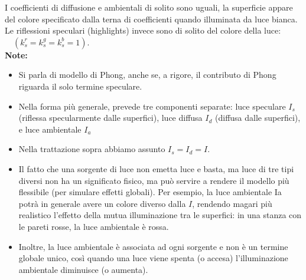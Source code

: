 \documentclass[a4paper, 10pt]{article}
\begin{document}
			I coefficienti di diffusione e ambientali di solito sono uguali, la superficie appare del colore specificato dalla terna di coefficienti quando illuminata da luce bianca.
			Le riflessioni speculari (highlights) invece sono di solito del colore
			della luce: $ \quad (k_s^r = k_s^g = k_s^b = 1) $.\\
			
			\textbf{Note:}
			\begin{itemize}
				\item Si parla di modello di Phong, anche se, a rigore, il contributo di Phong
				riguarda il solo termine speculare.
				\item Nella forma più generale, prevede tre componenti separate: luce
				speculare $ I_s $ (riflessa specularmente dalle superfici), luce diffusa $ I_d $
				(diffusa dalle superfici), e luce ambientale $ I_a $
				\item Nella trattazione sopra abbiamo assunto $ I_s =I_d = I $.
				\item Il fatto che una sorgente di luce non emetta luce e basta, ma luce di tre
				tipi diversi non ha un significato fisico, ma può servire a rendere il
				modello più flessibile (per simulare effetti globali). Per esempio, la luce
				ambientale Ia potrà in generale avere un colore diverso dalla $ I $,
				rendendo magari più realistico l’effetto della mutua illuminazione tra le
				superfici: in una stanza con le pareti rosse, la luce ambientale è rossa.
				\item Inoltre, la luce ambientale è associata ad ogni sorgente e non è un
				termine globale unico, così quando una luce viene spenta (o accesa)
				l’illuminazione ambientale diminuisce (o aumenta).
			\end{itemize}
			
\end{document}
